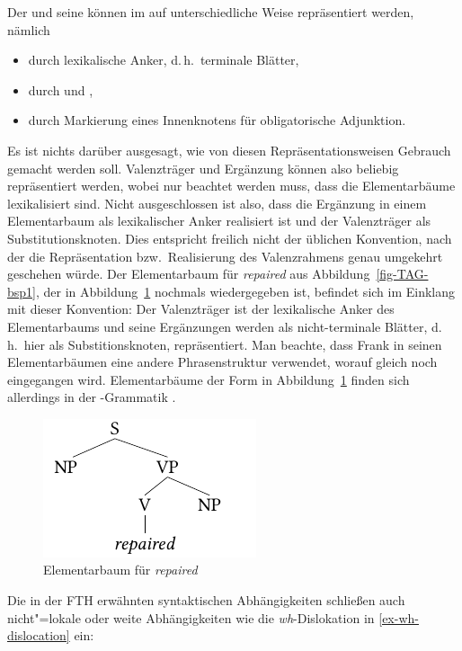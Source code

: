 Der  und seine  können im  auf unterschiedliche Weise repräsentiert werden, nämlich 
\begin{itemize}
  \item durch lexikalische Anker, d.\,h.\ terminale Blätter,
  \item durch  und ,
  \item durch Markierung eines Innenknotens für obligatorische Adjunktion.
\end{itemize}
Es ist nichts darüber ausgesagt, wie von diesen Repräsentationsweisen Gebrauch gemacht werden soll. Valenzträger und Ergänzung können also beliebig repräsentiert werden, wobei nur beachtet werden muss, dass die Elementarbäume lexikalisiert sind. Nicht ausgeschlossen ist also, dass die Ergänzung in einem Elementarbaum als lexikalischer Anker realisiert ist und der Valenzträger als Substitutionsknoten. Dies entspricht freilich nicht der üblichen Konvention, nach der die Repräsentation bzw.\ Realisierung des Valenzrahmens genau umgekehrt geschehen würde. Der Elementarbaum für {\it repaired} aus Abbildung~\ref{fig-TAG-bsp1}, der in Abbildung~\ref{fig-TAG-bsp1-1} nochmals wiedergegeben ist, befindet sich im Einklang mit dieser Konvention: Der Valenzträger ist der lexikalische Anker des Elementarbaums und seine Ergänzungen werden als nicht-terminale Blätter, d.\,h.\ hier als Substitionsknoten, repräsentiert. Man beachte, dass Frank in seinen Elementarbäumen eine andere Phrasenstruktur verwendet, worauf gleich noch eingegangen wird. Elementarbäume der Form in Abbildung~\ref{fig-TAG-bsp1-1} finden sich allerdings in der -Grammatik \citep{xtag:01}. 
\begin{figure}[t]
\centering
\includegraphics{graphics/abb56.pdf}
\caption{\label{fig-TAG-bsp1-1}Elementarbaum für {\it repaired}}
\end{figure}

Die in der FTH erwähnten syntaktischen Abhängigkeiten schlie\ss en auch nicht"=lokale oder weite Abhängigkeiten wie die \textit{wh}-Dislokation in \ref{ex-wh-dislocation} ein:

